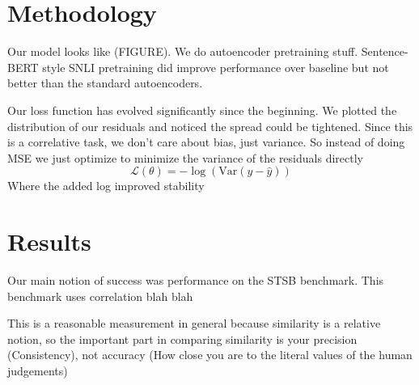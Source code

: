 \documentclass[14pt]{article}
\begin{document}

\section{Methodology}
Our model looks like (FIGURE). We do autoencoder pretraining stuff. Sentence-BERT style SNLI pretraining did improve
performance over baseline but not better than the standard autoencoders.

Our loss function has evolved significantly since the beginning. We plotted the distribution of our residuals and noticed
the spread could be tightened. Since this is a correlative task, we don't care about bias, just variance. So instead of doing MSE
we just optimize to minimize the variance of the residuals directly
$$
\mathcal{L}(\theta) = -\log(\text{Var}(y - \hat{y}))
$$
Where the added log improved stability

\section{Results}
Our main notion of success was performance on the STSB \cite{STS} benchmark. This benchmark uses correlation blah blah

This is a reasonable measurement in general because similarity is a relative notion, so the important part in comparing similarity
is your precision (Consistency), not accuracy (How close you are to the literal values of the human judgements)
\end{document}
